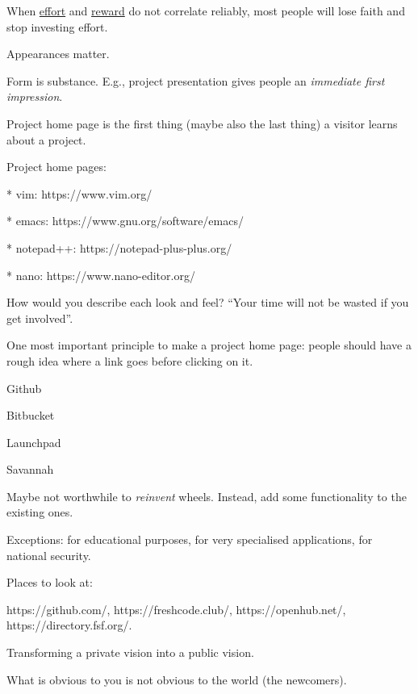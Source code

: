 \documentclass[landscape,30pt]{foils}
\begin{document}
When \underline{effort} and \underline{reward} do not correlate reliably, most people will lose faith and stop investing effort.


Appearances matter.

Form is substance.  E.g., project presentation gives people an {\em immediate first impression}.

Project home page is the first thing (maybe also the last thing) a visitor learns about a project.

Project home pages:

* vim: https://www.vim.org/

* emacs: https://www.gnu.org/software/emacs/

* notepad++: https://notepad-plus-plus.org/

* nano: https://www.nano-editor.org/

How would you describe each look and feel?  ``Your time will not be wasted if you get involved''.

One most important principle to make a project home page: people should have a rough idea where a link goes before clicking on it.


Github

Bitbucket

Launchpad

Savannah



Maybe not worthwhile to {\em reinvent} wheels.  Instead, add some functionality to the existing ones.

Exceptions: for educational purposes, for very specialised applications, for national security.

Places to look at:

https://github.com/, https://freshcode.club/, https://openhub.net/, https://directory.fsf.org/.



Transforming a private vision into a public vision.

What is obvious to you is not obvious to the world (the newcomers).
\end{document}
